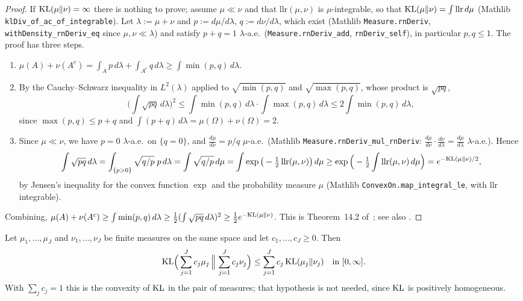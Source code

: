 \begin{proof}
\leanok
If $\mathrm{KL}(\mu\|\nu) = \infty$ there is nothing to prove; assume $\mu \ll \nu$ and that
$\mathrm{llr}(\mu,\nu)$ is $\mu$-integrable, so that $\mathrm{KL}(\mu\|\nu) = \int \mathrm{llr}\,d\mu$
(Mathlib \texttt{klDiv\_of\_ac\_of\_integrable}). Let $\lambda := \mu + \nu$ and
$p := d\mu/d\lambda$, $q := d\nu/d\lambda$, which exist (Mathlib
\texttt{Measure.rnDeriv}, \texttt{withDensity\_rnDeriv\_eq} since $\mu,\nu \ll \lambda$) and
satisfy $p + q = 1$ $\lambda$-a.e.\ (\texttt{Measure.rnDeriv\_add}, \texttt{rnDeriv\_self}), in
particular $p, q \le 1$. The proof has three steps.
\begin{enumerate}
  \item[(i)] $\mu(A) + \nu(A^c) = \int_A p\,d\lambda + \int_{A^c} q\,d\lambda \ge \int \min(p,q)\,d\lambda$.
  \item[(ii)] By the Cauchy--Schwarz inequality in $L^2(\lambda)$ applied to
        $\sqrt{\min(p,q)}$ and $\sqrt{\max(p,q)}$, whose product is $\sqrt{pq}$,
        \[
          \Big(\int\sqrt{pq}\,d\lambda\Big)^2 \le \int\min(p,q)\,d\lambda\cdot\int\max(p,q)\,d\lambda
          \le 2\int \min(p,q)\,d\lambda ,
        \]
        since $\max(p,q) \le p + q$ and $\int (p+q)\,d\lambda = \mu(\Omega) + \nu(\Omega) = 2$.
  \item[(iii)] Since $\mu \ll \nu$, we have $p = 0$ $\lambda$-a.e.\ on $\{q = 0\}$, and
        $\frac{d\mu}{d\nu} = p/q$ $\mu$-a.e.\ (Mathlib \texttt{Measure.rnDeriv\_mul\_rnDeriv}:
        $\frac{d\mu}{d\nu}\cdot\frac{d\nu}{d\lambda} = \frac{d\mu}{d\lambda}$ $\lambda$-a.e.). Hence
        \[
          \int \sqrt{pq}\,d\lambda = \int_{\{p>0\}} \sqrt{q/p}\;p\,d\lambda
          = \int \sqrt{q/p}\,d\mu = \int \exp\big(-\tfrac12\,\mathrm{llr}(\mu,\nu)\big)\,d\mu
          \ge \exp\Big(-\tfrac12\int \mathrm{llr}(\mu,\nu)\,d\mu\Big)
          = e^{-\mathrm{KL}(\mu\|\nu)/2},
        \]
        by Jensen's inequality for the convex function $\exp$ and the probability measure
        $\mu$ (Mathlib \texttt{ConvexOn.map\_integral\_le}, with $\mathrm{llr}$ integrable).
\end{enumerate}
Combining, $\mu(A) + \nu(A^c) \ge \int\min(p,q)\,d\lambda \ge \tfrac12 (\int\sqrt{pq}\,d\lambda)^2
\ge \tfrac12 e^{-\mathrm{KL}(\mu\|\nu)}$. This is Theorem~14.2 of~\cite{lattimore2020bandit}; see also
\cite{tsybakov2009introduction}.
\end{proof}

\begin{lemma}\label{lem:kl_joint_convex}
\leanok
Let $\mu_1,\dots,\mu_J$ and $\nu_1,\dots,\nu_J$ be finite measures on the same space and let
$c_1,\dots,c_J \ge 0$. Then
\[
  \mathrm{KL}\Big(\sum_{j=1}^J c_j\mu_j \,\Big\|\, \sum_{j=1}^J c_j\nu_j\Big)
  \le \sum_{j=1}^J c_j\,\mathrm{KL}(\mu_j\|\nu_j) \quad\text{in } [0,\infty].
\]
With $\sum_j c_j = 1$ this is the convexity of $\mathrm{KL}$ in the pair of measures; that hypothesis is
not needed, since $\mathrm{KL}$ is positively homogeneous.
\end{lemma}

